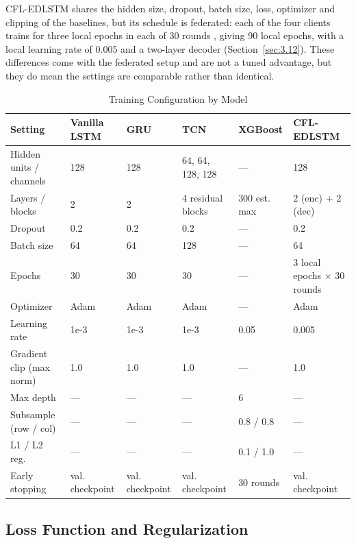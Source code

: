 CFL-EDLSTM shares the hidden size, dropout, batch size, loss, optimizer and
clipping of the baselines, but its schedule is federated: each of the four
clients trains for three local epochs in each of 30 rounds \cite{McMahan2017},
giving 90 local epochs, with a local learning rate of 0.005 and a two-layer
decoder (Section~\ref{sec:3.12}). These differences come with the federated setup
and are not a tuned advantage, but they do mean the settings are comparable
rather than identical.

\begin{table}[htbp]
  \centering
  \caption{Training Configuration by Model}
  \label{tab:3.7}
  \small
  \begin{tabularx}{\linewidth}{@{}L{2.6cm} X X X X X@{}}
    \toprule
    \textbf{Setting} & \textbf{Vanilla LSTM} & \textbf{GRU} & \textbf{TCN} & \textbf{XGBoost} & \textbf{CFL-EDLSTM} \\
    \midrule
    Hidden units / channels & 128 & 128 & 64, 64, 128, 128 & --- & 128 \\
    Layers / blocks & 2 & 2 & 4 residual blocks & 300 est. max & 2 (enc) + 2 (dec) \\
    Dropout & 0.2 & 0.2 & 0.2 & --- & 0.2 \\
    Batch size & 64 & 64 & 128 & --- & 64 \\
    Epochs & 30 & 30 & 30 & --- & 3 local epochs $\times$ 30 rounds \\
    Optimizer & Adam & Adam & Adam & --- & Adam \\
    Learning rate & 1e-3 & 1e-3 & 1e-3 & 0.05 & 0.005 \\
    Gradient clip (max norm) & 1.0 & 1.0 & 1.0 & --- & 1.0 \\
    Max depth & --- & --- & --- & 6 & --- \\
    Subsample (row / col) & --- & --- & --- & 0.8 / 0.8 & --- \\
    L1 / L2 reg. & --- & --- & --- & 0.1 / 1.0 & --- \\
    Early stopping & val. checkpoint & val. checkpoint & val. checkpoint & 30 rounds & val. checkpoint \\
    \bottomrule
  \end{tabularx}
\end{table}

\subsection{Loss Function and Regularization}
\label{sec:3.14.3}

